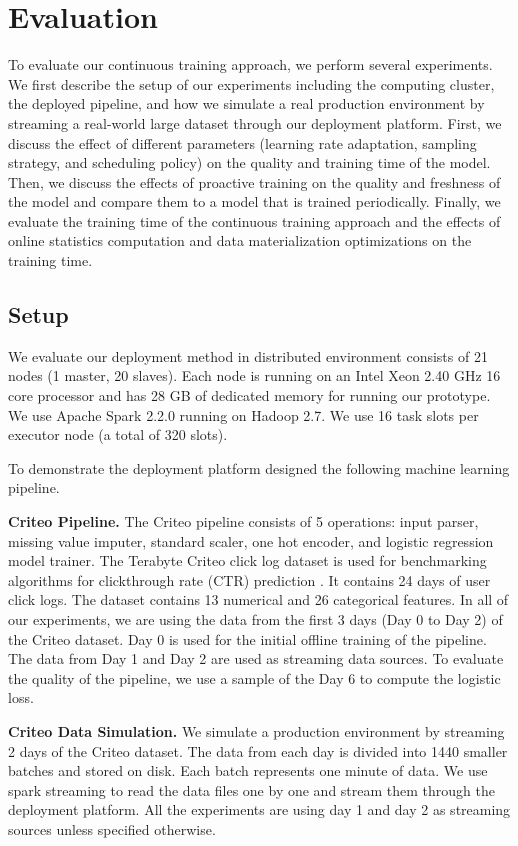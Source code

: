 \section{Evaluation} \label{evaluation} 
To evaluate our continuous training approach, we perform several experiments.
We first describe the setup of our experiments including the computing cluster, the deployed pipeline, and how we simulate a real production environment by streaming a real-world large dataset through our deployment platform.
First, we discuss the effect of different parameters (learning rate adaptation, sampling strategy, and scheduling policy) on the quality and training time of the model.
Then, we discuss the effects of proactive training on the quality and freshness of the model and compare them to a model that is trained periodically.
Finally, we evaluate the training time of the continuous training approach and the effects of online statistics computation and data materialization optimizations on the training time.

\subsection{Setup}\label{subsec:setup}
We evaluate our deployment method in distributed environment consists of 21 nodes (1 master, 20 slaves).
Each node is running on an Intel Xeon 2.40 GHz 16 core processor and has 28 GB of dedicated memory for running our prototype.
We use Apache Spark 2.2.0 running on Hadoop 2.7.
We use 16 task slots per executor node (a total of 320 slots).

To demonstrate the deployment platform designed the following machine learning pipeline.

\textbf{Criteo Pipeline.} 
The Criteo pipeline consists of 5 operations: input parser, missing value imputer, standard scaler, one hot encoder, and logistic regression model trainer. 
The Terabyte Criteo click log dataset is used for benchmarking algorithms for clickthrough rate (CTR) prediction \cite{criteo-log}.
It contains 24 days of user click logs. 
The dataset contains 13 numerical and 26 categorical features. 
In all of our experiments, we are using the data from the first 3 days (Day 0 to Day 2) of the Criteo dataset.
Day 0 is used for the initial offline training of the pipeline.
The data from Day 1 and Day 2 are used as streaming data sources.
To evaluate the quality of the pipeline, we use a sample of the Day 6 to compute the logistic loss.

\textbf{Criteo Data Simulation.}
We simulate a production environment by streaming 2 days of the Criteo dataset.
The data from each day is divided into 1440 smaller batches and stored on disk.
Each batch represents one minute of data.
We use spark streaming to read the data files one by one and stream them through the deployment platform. 
All the experiments are using day 1 and day 2 as streaming sources unless specified otherwise.

